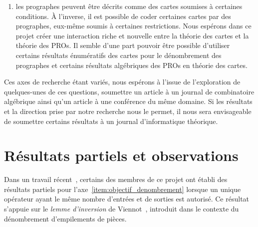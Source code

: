 \documentclass[10pt,reqno]{amsart}
\numberwithin{equation}{subsection}
\begin{document}
\begin{enumerate}[fullwidth,label={\bf (\arabic*)}]
    \item \label{item:objectif_cartes}
    les prographes peuvent être décrits comme des cartes soumises à 
    certaines conditions. À l'inverse, il est possible de coder certaines
    cartes par des prographes, eux-même soumis à certaines restrictions.
    Nous espérons dans ce projet créer une interaction riche et nouvelle 
    entre la théorie des cartes et la théorie des PROs. Il semble d'une 
    part pouvoir être possible d'utiliser certains résultats énumératifs 
    des cartes pour le dénombrement des prographes et certains résultats 
    algébriques des PROs en théorie des cartes.
\end{enumerate}

Ces axes de recherche étant variés, nous espérons à l'issue de 
l'exploration de quelques-unes de ces questions, soumettre un article à 
un journal de combinatoire algébrique ainsi qu'un article à une 
conférence du même domaine. Si les résultats et la direction prise
par notre recherche nous le permet, il nous sera envisageable de soumettre
certains résultats à un journal d'informatique théorique.

\section{Résultats partiels et observations}
Dans un travail récent~\cite{BG14}, certains des membres de ce projet 
ont établi des résultats partiels pour 
l'axe~\eqref{item:objectif_denombrement} lorsque un unique opérateur 
ayant le même nombre d'entrées et de sorties est autorisé. Ce résultat 
s'appuie sur le {\em lemme d'inversion} de Viennot~\cite{Vie86},
introduit dans le contexte du dénombrement d'empilements de pièces. 

\end{document}
